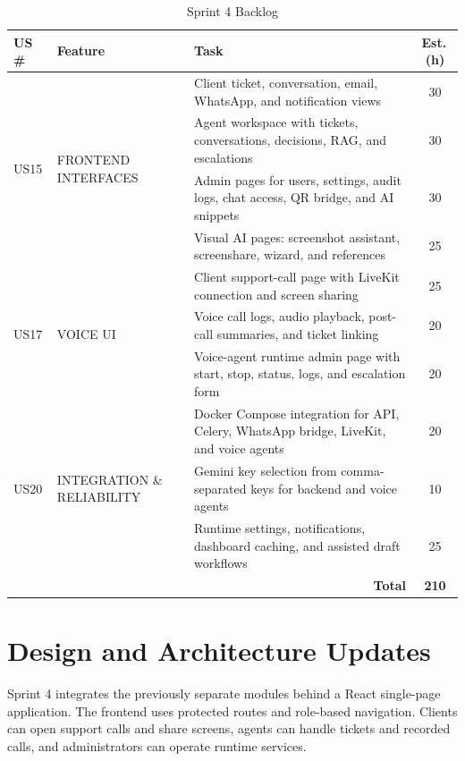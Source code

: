 \begin{table}[H]
\smaller
\centering
\caption{Sprint 4 Backlog}
\label{tab:sprint4-backlog}
\begin{tabular}{|l|p{4.8cm}|p{4.8cm}|c|}
\hline
\textbf{US \#} & \textbf{Feature} & \textbf{Task} & \textbf{Est.\,(h)} \\
\hline
\multirow{4}{*}{US15} & \multirow{4}{*}{\parbox{4.8cm}{FRONTEND INTERFACES}} & Client ticket, conversation, email, WhatsApp, and notification views & 30 \\
\cline{3-4}
 & & Agent workspace with tickets, conversations, decisions, RAG, and escalations & 30 \\
\cline{3-4}
 & & Admin pages for users, settings, audit logs, chat access, QR bridge, and AI snippets & 30 \\
\cline{3-4}
 & & Visual AI pages: screenshot assistant, screenshare, wizard, and references & 25 \\
\hline
\multirow{3}{*}{US17} & \multirow{3}{*}{\parbox{4.8cm}{VOICE UI}} & Client support-call page with LiveKit connection and screen sharing & 25 \\
\cline{3-4}
 & & Voice call logs, audio playback, post-call summaries, and ticket linking & 20 \\
\cline{3-4}
 & & Voice-agent runtime admin page with start, stop, status, logs, and escalation form & 20 \\
\hline
\multirow{3}{*}{US20} & \multirow{3}{*}{\parbox{4.8cm}{INTEGRATION \& RELIABILITY}} & Docker Compose integration for API, Celery, WhatsApp bridge, LiveKit, and voice agents & 20 \\
\cline{3-4}
 & & Gemini key selection from comma-separated keys for backend and voice agents & 10 \\
\cline{3-4}
 & & Runtime settings, notifications, dashboard caching, and assisted draft workflows & 25 \\
\hline
\multicolumn{3}{|r|}{\textbf{Total}} & \textbf{210} \\
\hline
\end{tabular}
\end{table}

\section{Design and Architecture Updates}

Sprint 4 integrates the previously separate modules behind a React single-page application. The frontend uses protected routes and role-based navigation. Clients can open support calls and share screens, agents can handle tickets and recorded calls, and administrators can operate runtime services.

